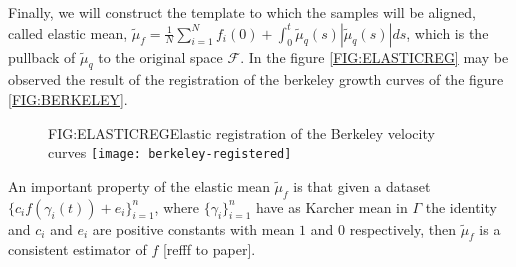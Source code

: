 Finally, we will construct the template to which the samples will be aligned,
called elastic mean,
$\tilde \mu_f = \frac{1}{N} \sum_{i=1}^N f_i(0) +
\int_0^t \tilde \mu_q(s) | \tilde \mu_q(s)| ds$,
which is the pullback of $\tilde \mu_q$ to the original space $\mathscr{F}$. In
the figure \ref{FIG:ELASTICREG} may be observed the result of the registration of the
berkeley growth curves of the figure \ref{FIG:BERKELEY}.

\begin{figure}[Elastic registration of the Berkeley velocity curves]{FIG:ELASTICREG}{Elastic registration of the Berkeley velocity curves}
  \texttt{[image: berkeley-registered]}
\end{figure}

An important property of the elastic mean
$\tilde \mu_f$ is that given a dataset $\{c_i f(\gamma_i(t)) + e_i\}_{i=1}^{n}$, where
$\{\gamma_i\}_{i=1}^{n}$ have as Karcher mean in $\Gamma$ the identity and $c_i$ and $e_i$ are positive
constants with mean $1$ and $0$ respectively, then $\tilde \mu_f$ is a
consistent estimator of $f$ [refff to paper].
